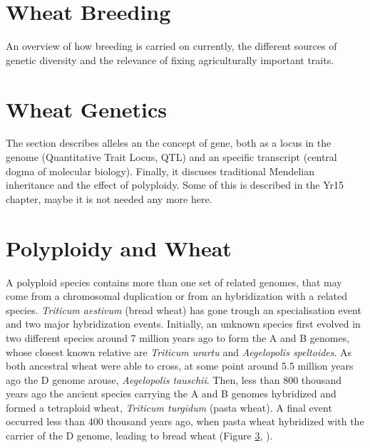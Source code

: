 

\section{Wheat Breeding}
An overview of how breeding is carried on currently, the different sources of genetic diversity and the relevance of fixing agriculturally important traits. 
\section{Wheat Genetics}
The section describes alleles an the concept of gene, both as a locus in the genome (Quantitative Trait Locus, QTL) and an specific transcript (central dogma of molecular biology). Finally, it discuses traditional Mendelian inheritance and the effect of polyploidy.  Some of this is described in the Yr15 chapter, maybe it is not needed any more here. 




\section{Polyploidy and Wheat}
\label{lit:polyploidy}

A polyploid species contains more than one set of related genomes, that may come from a chromosomal duplication or from an hybridization with a related species. 
\textit{Triticum aestivum} (bread wheat) has gone trough an specialisation event and two major hybridization events. 
Initially, an unknown species first evolved in two different species around 7 million years ago to form the A and B genomes, whose closest known relative are \textit{Triticum urartu} and \textit{Aegelopolis speltoides}. 
As both ancestral wheat were able to cross, at some point around 5.5 million years ago the D genome arouse, \textit{Aegelopolis tauschii}. 
Then, less than 800 thousand years ago the ancient species carrying the  A and B genomes hybridized and formed a tetraploid wheat, \textit{Triticum turgidum} (pasta wheat). 
A final event occurred less than 400 thousand years ago, when pasta wheat hybridized with the carrier of the D genome, leading to bread wheat (Figure \ref{lit:polyploidy}, \citealt{Marcussen2014}).  

